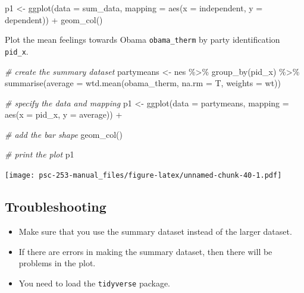 \documentclass[
]{book}
\newenvironment{Shaded}{\begin{snugshade}}{\end{snugshade}}
\newcommand{\AttributeTok}[1]{\textcolor[rgb]{0.77,0.63,0.00}{#1}}
\newcommand{\CommentTok}[1]{\textcolor[rgb]{0.56,0.35,0.01}{\textit{#1}}}
\newcommand{\FunctionTok}[1]{\textcolor[rgb]{0.00,0.00,0.00}{#1}}
\newcommand{\NormalTok}[1]{#1}
\newcommand{\OtherTok}[1]{\textcolor[rgb]{0.56,0.35,0.01}{#1}}
\newcommand{\SpecialCharTok}[1]{\textcolor[rgb]{0.00,0.00,0.00}{#1}}
\providecommand{\tightlist}{%
  \setlength{\itemsep}{0pt}\setlength{\parskip}{0pt}}
\begin{document}
\begin{Shaded}
\begin{Highlighting}[]
\NormalTok{p1 }\OtherTok{\textless{}{-}} \FunctionTok{ggplot}\NormalTok{(}\AttributeTok{data =}\NormalTok{ sum\_data, }
             \AttributeTok{mapping =} \FunctionTok{aes}\NormalTok{(}\AttributeTok{x =}\NormalTok{ independent, }\AttributeTok{y =}\NormalTok{ dependent)) }\SpecialCharTok{+}
  \FunctionTok{geom\_col}\NormalTok{()}
\end{Highlighting}
\end{Shaded}

Plot the mean feelings towards Obama \texttt{obama\_therm} by party identification \texttt{pid\_x}.

\begin{Shaded}
\begin{Highlighting}[]
\CommentTok{\# create the summary dataset}
\NormalTok{partymeans }\OtherTok{\textless{}{-}}\NormalTok{ nes }\SpecialCharTok{\%\textgreater{}\%}
  \FunctionTok{group\_by}\NormalTok{(pid\_x) }\SpecialCharTok{\%\textgreater{}\%}
  \FunctionTok{summarise}\NormalTok{(}\AttributeTok{average =} \FunctionTok{wtd.mean}\NormalTok{(obama\_therm, }\AttributeTok{na.rm =}\NormalTok{ T,}
                               \AttributeTok{weights =}\NormalTok{ wt))}

\CommentTok{\# specify the data and mapping}
\NormalTok{p1 }\OtherTok{\textless{}{-}} \FunctionTok{ggplot}\NormalTok{(}\AttributeTok{data =}\NormalTok{ partymeans,}
             \AttributeTok{mapping =} \FunctionTok{aes}\NormalTok{(}\AttributeTok{x =}\NormalTok{ pid\_x, }\AttributeTok{y =}\NormalTok{ average)) }\SpecialCharTok{+}
  
  \CommentTok{\# add the bar shape}
  \FunctionTok{geom\_col}\NormalTok{()}

\CommentTok{\# print the plot}
\NormalTok{p1}
\end{Highlighting}
\end{Shaded}

\texttt{[image: psc-253-manual\_files/figure-latex/unnamed-chunk-40-1.pdf]}

\hypertarget{troubleshooting-12}{%
\subsection{Troubleshooting}\label{troubleshooting-12}}

\begin{itemize}
\tightlist
\item
  Make sure that you use the summary dataset instead of the larger dataset.
\item
  If there are errors in making the summary dataset, then there will be problems in the plot.
\item
  You need to load the \texttt{tidyverse} package.
\end{itemize}
\end{document}

